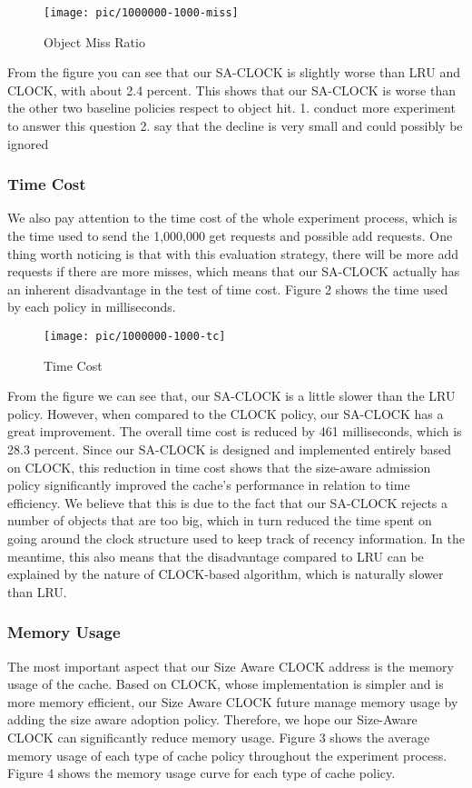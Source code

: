\documentclass[conference]{IEEEtran}
\begin{document}
\begin{figure}[h]
    \centering
    \texttt{[image: pic/1000000-1000-miss]}
    \caption{Object Miss Ratio}
\end{figure}

From the figure you can see that our SA-CLOCK is slightly worse than LRU and CLOCK, with about 2.4 percent. This shows that our SA-CLOCK is worse than the other two baseline policies respect to object hit.
1. conduct more experiment to answer this question
2. say that the decline is very small and could possibly be ignored


\subsubsection{Time Cost}
We also pay attention to the time cost of the whole experiment process, which is the time used to send the 1,000,000 get requests and possible add requests. One thing worth noticing is that with this evaluation strategy, there will be more add requests if there are more misses, which means that our SA-CLOCK actually has an inherent disadvantage in the test of time cost. Figure 2 shows the time used by each policy in milliseconds.

\begin{figure}[h]
    \centering
    \texttt{[image: pic/1000000-1000-tc]}
    \caption{Time Cost}
\end{figure}

From the figure we can see that, our SA-CLOCK is a little slower than the LRU policy. However, when compared to the CLOCK policy, our SA-CLOCK has a great improvement. The overall time cost is reduced by 461 milliseconds, which is 28.3 percent. Since our SA-CLOCK is designed and implemented entirely based on CLOCK, this reduction in time cost shows that the size-aware admission policy significantly improved the cache's performance in relation to time efficiency. We believe that this is due to the fact that our SA-CLOCK rejects a number of objects that are too big, which in turn reduced the time spent on going around the clock structure used to keep track of recency information. In the meantime, this also means that the disadvantage compared to LRU can be explained by the nature of CLOCK-based algorithm, which is naturally slower than LRU.


\subsubsection{Memory Usage}
The most important aspect that our Size Aware CLOCK address is the memory usage of the cache. Based on CLOCK, whose implementation is simpler and is more memory efficient, our Size Aware CLOCK future manage memory usage by adding the size aware adoption policy. Therefore, we hope our Size-Aware CLOCK can significantly reduce memory usage. Figure 3 shows the average memory usage of each type of cache policy throughout the experiment process. Figure 4 shows the memory usage curve for each type of cache policy.
\end{document}
